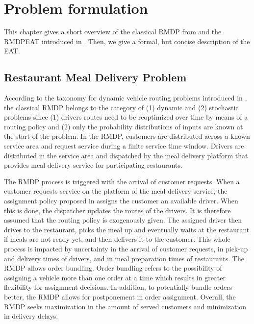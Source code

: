 \chapter{Problem formulation}

This chapter gives a short overview of the classical RMDP from \cite{UlmerRMDP} and the RMDPEAT introduced in \cite{Hildebrandt2020_EAT}. Then, we give a formal, but concise description of the EAT.
\section{Restaurant Meal Delivery Problem}

According to the taxonomy for dynamic vehicle routing problems introduced in \cite{psaraftis}, the classical RMDP belongs to the category of (1) dynamic and (2) stochastic problems since (1) drivers routes need to be reoptimized over time by means of a routing policy and (2) only the probability distributions of inputs are known at the start of the problem. In the RMDP, customers are distributed across a known service area and request service during a finite service time window. Drivers are distributed in the service area and dispatched by the meal delivery platform that provides meal delivery service for participating restaurants. 

The RMDP process is triggered with the arrival of customer requests. When a customer requests service on the platform of the meal delivery service, the assignment policy proposed in \cite{UlmerRMDP} assigns the customer an available driver. When this is done, the dispatcher updates the routes of the drivers. It is therefore assumed that the routing policy is exogenously given. The assigned driver then drives to the restaurant, picks the meal up and eventually waits at the restaurant if meals are not ready yet, and then delivers it to the customer. This whole process is impacted by uncertainty in the arrival of customer requests, in pick-up and delivery times of drivers, and in meal preparation times of restaurants.
The RMDP allows order bundling. Order bundling refers to the possibility of assigning a vehicle more than one order at a time which results in greater flexibility for assignment decisions. In addition, to potentially bundle orders better, the RMDP allows for postponement in order assignment.
Overall, the RMDP seeks maximization in the amount of served customers and minimization in delivery delays. 

